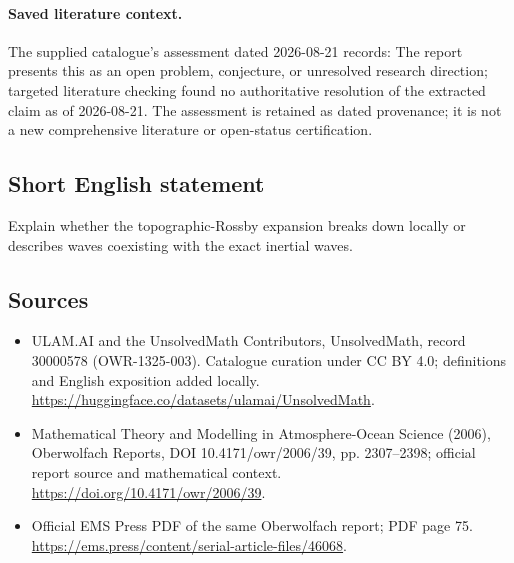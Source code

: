 \documentclass[11pt]{article}
\begin{document}
\paragraph{Saved literature context.} The supplied catalogue's assessment dated 2026-08-21 records: The report presents this as an open problem, conjecture, or unresolved research direction; targeted literature checking found no authoritative resolution of the extracted claim as of 2026-08-21. The assessment is retained as dated provenance; it is not a new comprehensive literature or open-status certification.
\subsection{Short English statement}
Explain whether the topographic-Rossby expansion breaks down locally or describes waves coexisting with the exact inertial waves.
\subsection{Sources}
\begin{itemize}
\item[\hypertarget{source:30000578:1}{S1}] ULAM.AI and the UnsolvedMath Contributors, UnsolvedMath, record 30000578 (OWR-1325-003). Catalogue curation under CC BY 4.0; definitions and English exposition added locally.
\url{https://huggingface.co/datasets/ulamai/UnsolvedMath}.
\item[\hypertarget{source:30000578:2}{S2}] Mathematical Theory and Modelling in Atmosphere-Ocean Science (2006), Oberwolfach Reports, DOI 10.4171/owr/2006/39, pp. 2307--2398; official report source and mathematical context.
\url{https://doi.org/10.4171/owr/2006/39}.
\item[\hypertarget{source:30000578:3}{S3}] Official EMS Press PDF of the same Oberwolfach report; PDF page 75.
\url{https://ems.press/content/serial-article-files/46068}.
\end{itemize}
\label{end:30000578}
\end{document}
